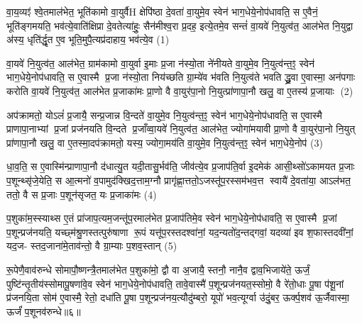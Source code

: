 \setcounter{anuvakam}{0}
वा॒य॒व्यꣵ॑ श्वे॒तमाल॑भेत॒ भूति॑कामो वा॒युर्वैH क्षेपि॑ष्ठा दे॒वता॑ वा॒युमे॒व स्वेन॑ भाग॒धेये॒नोप॑धावति॒ स ए॒वैनं॒ भूति॑ङ्गमयति॒ भव॑त्ये॒वाति॑क्षिप्रा दे॒वतेत्या॑हुः॒ सैन॑मीश्व॒रा प्र॒दह॒ इत्ये॒तमे॒व सन्तं॑ वा॒यवे॑ नि॒युत्व॑त॒ आल॑भेत नि॒युद्वा अ॑स्य॒ धृति॑र्द्धृ॒त ए॒व भूति॒मुपै॒त्यप्र॑दाहाय॒ भव॑त्ये॒व (1)

वा॒यवे॑ नि॒युत्व॑त॒ आल॑भेत॒ ग्राम॑कामो वा॒युर्वा इ॒माः प्र॒जा न॑स्यो॒ता ने॑नीयते वा॒युमे॒व नि॒युत्व॑न्त॒ꣵ॒ स्वेन॑ भाग॒धेये॒नोप॑धावति॒ स ए॒वास्मै प्र॒जा न॑स्यो॒ता निय॑च्छति ग्रा॒म्ये॑व भ॑वति नि॒युत्व॑ते भवति द्ध्रु॒वा ए॒वास्मा॒ अन॑पगाः करोति वा॒यवे॑ नि॒युत्व॑त॒ आल॑भेत प्र॒जाका॑मः प्रा॒णो वै वा॒युर॑पा॒नो नि॒युत्प्रा॑णापा॒नौ खलु॒ वा ए॒तस्य॑ प्र॒जायाः (2)

अप॑क्रामतो॒ योऽलं॑ प्र॒जायै॒ सन्प्र॒जान्न वि॒न्दते॑ वा॒युमे॒व नि॒युत्व॑न्त॒ꣵ॒ स्वेन॑ भाग॒धेये॒नोप॑धावति॒ स ए॒वास्मै प्राणापा॒नाभ्यां प्र॒जां प्रज॑नयति वि॒न्दते प्र॒जाँव्वा॒यवे॑ नि॒युत्व॑त॒ आल॑भेत॒ ज्योगा॑मयावी प्रा॒णो वै वा॒युर॑पा॒नो नि॒युत् प्रा॑णापा॒नौ खलु॒ वा ए॒तस्मा॒दप॑क्रामतो॒ यस्य॒ ज्योगा॒मय॑ति वा॒युमे॒व नि॒युत्व॑न्त॒ꣵ॒ स्वेन॑ भाग॒धेये॒नोप॑ (3)

धा॒व॒ति॒ स ए॒वास्मि॑न्प्राणापा॒नौ द॑धात्यु॒त यदी॒तासु॒र्भव॑ति॒ जीव॑त्ये॒व प्र॒जाप॑ति॒र्वा इ॒दमेक॑ आसी॒थ्सो॑ऽकामयत प्र॒जाः प॒शून्थ्सृ॑जे॒येति॒ स आ॒त्मनो॑ व॒पामुद॑क्खिद॒त्ताम॒ग्नौ प्रागृ॑ह्णा॒त्ततो॒ऽजस्तू॑प॒रस्सम॑भव॒त्त स्वायै॑ दे॒वता॑या॒ आऽल॑भत॒ ततो॒ वै स प्र॒जाः प॒शून॑सृजत॒ यः प्र॒जाका॑मः (4)

प॒शुका॑म॒स्स्याथ्स ए॒तं प्रा॑जाप॒त्यम॒जन्तू॑प॒रमाल॑भेत प्र॒जाप॑तिमे॒व स्वेन॑ भाग॒धेये॒नोप॑धावति॒ स ए॒वास्मै प्र॒जां प॒शून्प्रज॑नयति॒ यच्छ्म॑श्रु॒णस्तत्पुरु॑षाणा रू॒पं यत्तू॑प॒रस्तदश्वा॑नां॒ यद॒न्यतो॑द॒न्तद्गवां॒ यदव्या॑ इव श॒फास्तदवी॑नां॒ यद॒ज- स्तद॒जाना॑मे॒ताव॑न्तो॒ वै ग्रा॒म्याः प॒शव॒स्तान् (5)

रू॒पेणै॒वाव॑रुन्धे सोमापौ॒ष्णन्त्रै॒तमाल॑भेत प॒शुका॑मो॒ द्वौ वा अ॒जायै॒ स्तनौ॒ नानै॒व द्वाव॒भिजाये॑ते॒ ऊर्जं॒ पुष्टि॑न्तृ॒तीय॑स्सोमापू॒षणा॑वे॒व स्वेन॑ भाग॒धेये॒नोप॑धावति॒ तावे॒वास्मै॑ प॒शून्प्रज॑नयत॒स्सोमो॒ वै रे॑तो॒धाः पू॒षा प॑शू॒नां प्र॑जनयि॒ता सोम॑ ए॒वास्मै॒ रेतो॒ दधा॑ति पू॒षा प॒शून्प्रज॑नय॒त्यौदु॑म्बरो॒ यूपो॑ भव॒त्यूर्ग्वा उ॑दुं॒बर॒ ऊर्क्प॒शव॑ ऊ॒र्जैवास्मा॒ ऊर्जं॑ प॒शूनव॑रुन्धे॥६॥

{\anuvakamend{भव॑त्ये॒व प्र॒जाया॑ आ॒मय॑ति वा॒युमे॒व नि॒युत्व॑न्त॒ꣵ॒ स्वेन॑ भाग॒धेये॒नोप॑ प्र॒जाका॑म॒स्तान् यूप॒स्त्रयो॑दश च।\scriptsize  (1)]}}

